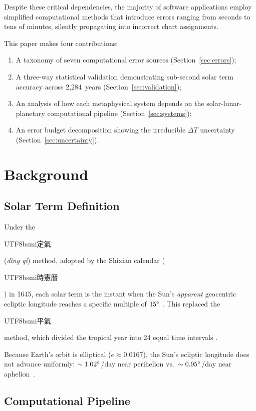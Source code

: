 \documentclass[10pt,a4paper]{article}
\newcommand{\zh}[1]{\begin{CJK}{UTF8}{bsmi}#1\end{CJK}}
\begin{document}
Despite these critical dependencies, the majority of software
applications employ simplified computational methods that introduce errors
ranging from seconds to tens of minutes, silently propagating into incorrect
chart assignments.

This paper makes four contributions:
\begin{enumerate}[label=(\roman*)]
  \item A taxonomy of seven computational error sources
        (Section~\ref{sec:errors});
  \item A three-way statistical validation demonstrating sub-second solar
        term accuracy across 2,284~years (Section~\ref{sec:validation});
  \item An analysis of how each metaphysical system depends on the
        solar-lunar-planetary computational pipeline
        (Section~\ref{sec:systems});
  \item An error budget decomposition showing the irreducible $\Delta T$
        uncertainty (Section~\ref{sec:uncertainty}).
\end{enumerate}

\section{Background}
\label{sec:background}

\subsection{Solar Term Definition}

Under the \zh{定氣} (\textit{d\`{i}ng q\`{i}}) method, adopted by the
Shixian calendar (\zh{時憲曆}) in 1645, each solar term is the instant when
the Sun's \emph{apparent} geocentric ecliptic longitude reaches a specific
multiple of $15\degree$ \cite{aslaksen2010, ytliu_rules}. This replaced the
\zh{平氣} method, which divided the tropical year into 24 equal time
intervals \cite{ytliu_solarterms}.

Because Earth's orbit is elliptical ($e \approx 0.0167$), the Sun's ecliptic
longitude does not advance uniformly: $\sim 1.02\degree$/day near perihelion
vs.\ $\sim 0.95\degree$/day near aphelion~\cite{meeus1998}.

\subsection{Computational Pipeline}
\label{subsec:pipeline}
\end{document}
